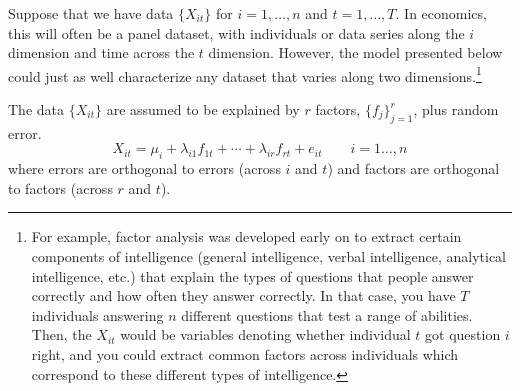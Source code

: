 \documentclass[12pt]{article}
\theoremstyle{plain}
\theoremstyle{definition}
\theoremstyle{remark}
\begin{document}
Suppose that we have data $\{X_{it}\}$ for $i=1,\ldots,n$ and
$t=1,\ldots,T$. In economics, this will often be a panel dataset, with
individuals or data series along the $i$ dimension and time across the
$t$ dimension. However, the model presented below could just as well
characterize any dataset that varies along two dimensions.\footnote{For
example, factor analysis was developed early on to extract certain
components of intelligence (general intelligence, verbal intelligence,
analytical intelligence, etc.) that explain the types of questions that
people answer correctly and how often they answer correctly. In that
case, you have $T$ individuals answering $n$ different questions that
test a range of abilities.  Then, the $X_{it}$ would be variables
denoting whether individual $t$ got question $i$ right, and you could
extract common factors across individuals which correspond to these
different types of intelligence.}

The data $\{X_{it}\}$ are assumed to be explained by $r$ factors,
$\{f_j\}_{j=1}^r$, plus random error. 
\begin{equation}
  X_{it} = \mu_i + \lambda_{i1} f_{1t} + \cdots + \lambda_{ir} f_{rt} + e_{it}
  \qquad i=1\ldots,n
\end{equation}
where errors are orthogonal to errors (across $i$ and $t$) and factors
are orthogonal to factors (across $r$ and $t$).
\end{document}

